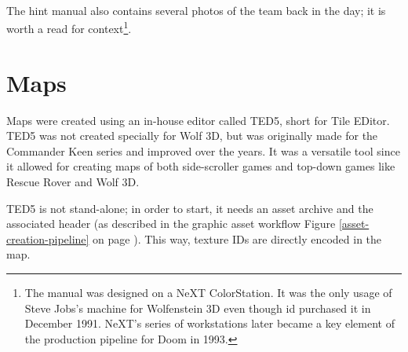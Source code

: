 \documentclass[book.tex]{subfiles}
\begin{document}
 





\label{hitler_drawing}
\begin{figure}[H]
\centering    
   \end{figure}



     \begin{figure}[H]
\centering
   \end{figure}
 
  \begin{figure}[H]
\centering
 \\
 \end{figure}



     \begin{figure}[H]
\centering
   \end{figure}

     \begin{figure}[H]
\centering
   \end{figure}


\par 
The hint manual also contains several photos of the team back in the day; it is worth a read for context\footnote{The manual was designed on a NeXT ColorStation. It was the only usage of Steve Jobs's machine for Wolfenstein 3D even though id purchased it in December 1991. NeXT's series of workstations later became a key element of the production pipeline for Doom in 1993.}.













\section{Maps}
Maps were created using an in-house editor called TED5, short for Tile EDitor. TED5 was not created specially for Wolf 3D, but was originally made for the Commander Keen series and improved over the years. It was a versatile tool since it allowed for creating maps of both side-scroller games and top-down games like Rescue Rover and Wolf 3D.\\
\par
 TED5 is not stand-alone; in order to start, it needs an asset archive and the  associated header (as described in the graphic asset workflow Figure \ref{asset-creation-pipeline} on page \pageref{asset-creation-pipeline}). This way, texture IDs are directly encoded in the map.\\
\end{document}
